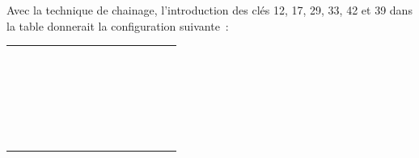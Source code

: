 		Avec la technique de chainage, l'introduction des clés 
		12, 17, 29, 33, 42 et 39 dans la table donnerait la configuration
		suivante~:

		\begin{center}
			\tablefirsthead{}
			\tablehead{}
			\tabletail{}
			\tablelasttail{}
			\begin{supertabular}{m{0.999cm}m{0.999cm}m{0.999cm}m{0.999cm}m{0.999cm}m{0.999cm}m{0.999cm}m{0.999cm}m{0.999cm}m{0.999cm}}
			 &
			 &
			 &
			 &
			 &
			 &
			 &
			 &
			 &
			\centering{}\\\hline
			 &
			 &
			 &
			 &
			 &
			 &
			 &
			 &
			 &
			\\\hline
			~
			 &
			~
			 &
			\centering{ $\downarrow $} &
			\centering{ $\downarrow $} &
			~
			 &
			~
			 &
			~
			 &
			\centering{ $\downarrow $} &
			~
			 &
			\centering\arraybslash{ $\downarrow $}\\\hhline{~~--~~~-~-}
			~
			 &
			 &
			 &
			 &
			~
			 &
			~
			 &
			 &
			 &
			 &
			\\\hhline{~~--~~~-~-}
			~
			 &
			~
			 &
			\centering{ $\downarrow $} &
			~
			 &
			~
			 &
			~
			 &
			~
			 &
			~
			 &
			~
			 &
			\centering\arraybslash{ $\downarrow $}\\\hhline{~~-~~~~~~-}
			~
			 &
			 &
			 &
			~
			 &
			~
			 &
			~
			 &
			~
			 &
			~
			 &
			 &
			\\\hhline{~~-~~~~~~-}
			\end{supertabular}
		\end{center}

